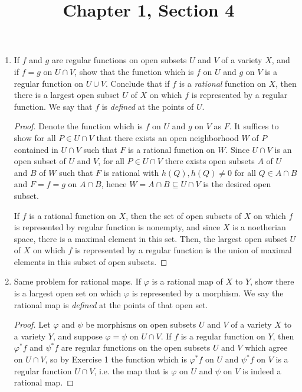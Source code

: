 \documentclass[a4paper]{article}
\title{Chapter 1, Section 4}
\begin{document}
\maketitle
\begin{enumerate} [label=\textbf{\arabic*.}, leftmargin=0cm]

\item[\textbf{1.}] If $f$ and $g$ are regular functions on open subsets $U$ and $V$ of a variety $X$, and if $f = g$ on $U \cap V$, show that the function which is $f$ on $U$ and $g$ on $V$ is a regular function on $U \cup V$. Conclude that if $f$ is a \textit{rational} function on $X$, then there is a largest open subset $U$ of $X$ on which $f$ is represented by a regular function. We say that $f$ is \textit{defined} at the points of $U$.

\begin{proof}
    Denote the function which is $f$ on $U$ and $g$ on $V$ as $F$. It suffices to show for all $P \in U \cap V$ that there exists an open neighborhood $W$ of $P$ contained in $U \cap V$ such that $F$ is a rational function on $W$. Since $U \cap V$ is an open subset of $U$ and $V$, for all $P \in U \cap V$ there exists open subsets $A$ of $U$ and $B$ of $W$ such that $F$ is rational with $h(Q), h(Q) \neq 0$ for all $Q \in A \cap B$ and $F = f = g$ on $A \cap B$, hence $W = A \cap B \subseteq U \cap V$ is the desired open subset.
    
    If $f$ is a rational function on $X$, then the set of open subsets of $X$ on which $f$ is represented by regular function is nonempty, and since $X$ is a noetherian space, there is a maximal element in this set. Then, the largest open subset $U$ of $X$ on which $f$ is represented by a regular function is the union of maximal elements in this subset of open subsets.
\end{proof}

\item[\textbf{2.}] Same problem for rational maps. If $\varphi$ is a rational map of $X$ to $Y$, show there is a largest open set on which $\varphi$ is represented by a morphism. We say the rational map is \textit{defined} at the points of that open set.

\begin{proof}
    Let $\varphi$ and $\psi$ be morphisms on open subsets $U$ and $V$ of a variety $X$ to a variety $Y$, and suppose $\varphi = \psi$ on $U \cap V$. If $f$ is a regular function on $Y$, then $\varphi^*f$ and $\psi^*f$ are regular functions on the open subsets $U$ and $V$ which agree on $U \cap V$, so by Exercise 1 the function which is $\varphi^*f$ on $U$ and $\psi^*f$ on $V$ is a regular function $U \cap V$, i.e. the map that is $\varphi$ on $U$ and $\psi$ on $V$ is indeed a rational map.


\end{proof}
\end{enumerate}
\end{document}
